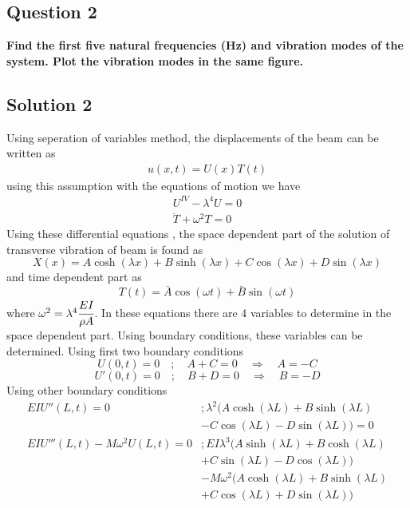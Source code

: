 \documentclass[]{report}
\begin{document}
\subsection*{Question 2}
\textbf{Find the first five natural frequencies (Hz) and vibration modes of the system. Plot the vibration modes in the same figure.}
\begin{center}
\subsection*{Solution 2}
\end{center}
Using seperation of variables method, the displacements of the beam can be written as
\begin{align}
u\left(x,t\right)=U\left(x\right)T\left(t\right)
\end{align}
using this assumption with the equations of motion we have
\begin{align}
U^{IV} -\lambda^4U=0\\
\ddot{T} +\omega^2 T=0
\end{align}
Using these differential equations , the space dependent part of the solution of transverse vibration of beam is found as
\begin{equation}
X(x)=A\cosh\left(\lambda x\right)+B\sinh\left(\lambda x\right)+C\cos\left(\lambda x\right)+D\sin\left(\lambda x\right)
\label{eq:spacesolution}
\end{equation}
and time dependent part as
\begin{equation*}
T(t)=\bar{A}\cos\left({\omega t}\right)+\bar{B}\sin\left({\omega t}\right)
\end{equation*}
where $\omega^2=\lambda^4 \cfrac{EI}{\rho A}$. In these equations there are 4 variables to determine in the space dependent part. Using boundary conditions, these variables can be determined. Using first two boundary conditions
\begin{equation}
U\left(0,t\right)= 0 \quad ; \quad  A+C=0 \quad \Longrightarrow \quad A=-C \label{eq:acrel}
\end{equation}
\begin{equation}
U'\left(0,t\right)= 0\quad ; \quad B+D=0 \quad \Longrightarrow \quad B=-D\label{eq:bdrel}
\end{equation}
Using other boundary conditions
\begin{align*}
EIU''\left(L,t\right)= 0&; \lambda^2 \biggl(A\cosh\left(\lambda L\right)+B\sinh\left(\lambda L\right)\\
&-C\cos\left(\lambda L\right) -D\sin\left(\lambda L\right)\biggr)=0\\
EIU'''\left(L,t\right)-M\omega^2U\left(L,t\right)= 0&; EI \lambda^3\biggl(A\sinh\left(\lambda L\right)+B\cosh\left(\lambda L\right)\\&+C\sin\left(\lambda L\right)-D\cos\left(\lambda L\right)\biggr)\\
&- M\omega^2\biggl(A\cosh\left(\lambda L\right)+B\sinh\left(\lambda L\right)\\&+C\cos\left(\lambda L\right)+D\sin\left(\lambda L\right) \biggr)
\end{align*}
\end{document}
